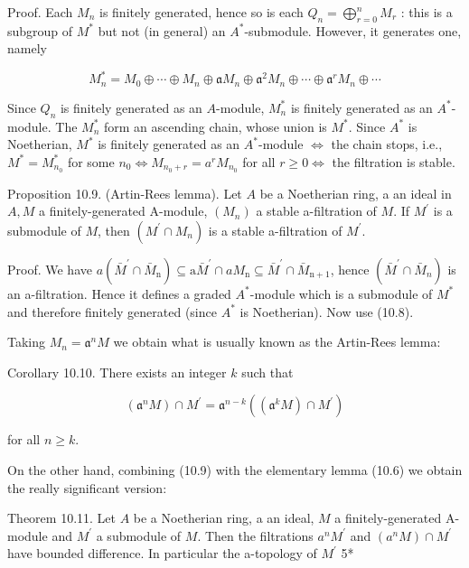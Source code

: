 \documentclass{standalone}
\theoremstyle{definition}
\theoremstyle{remark}
\begin{document}
Proof. Each $M_{n}$ is finitely generated, hence so is each $Q_{n}=\bigoplus_{r=0}^{n} M_{r}$ : this is a subgroup of $M^{*}$ but not (in general) an $A^{*}$-submodule. However, it generates one, namely

\[
M_{n}^{*}=M_{0} \oplus \cdots \oplus M_{n} \oplus \mathfrak{a} M_{n} \oplus \mathfrak{a}^{2} M_{n} \oplus \cdots \oplus \mathfrak{a}^{r} M_{n} \oplus \cdots
\]

Since $Q_{n}$ is finitely generated as an $A$-module, $M_{n}^{*}$ is finitely generated as an $A^{*}$-module. The $M_{n}^{*}$ form an ascending chain, whose union is $M^{*}$. Since $A^{*}$ is Noetherian, $M^{*}$ is finitely generated as an $A^{*}$-module $\Leftrightarrow$ the chain stops, i.e., $M^{*}=M_{n_{0}}^{*}$ for some $n_{0} \Leftrightarrow M_{n_{0}+r}=a^{r} M_{n_{0}}$ for all $r \geqslant 0 \Leftrightarrow$ the filtration is stable.

Proposition 10.9. (Artin-Rees lemma). Let $A$ be a Noetherian ring, a an ideal in $A, M$ a finitely-generated A-module, $\left(M_{n}\right)$ a stable a-filtration of $M$. If $M^{\prime}$ is a submodule of $M$, then $\left(M^{\prime} \cap M_{n}\right)$ is a stable a-filtration of $M^{\prime}$.

Proof. We have $a\left(\bar{M}^{\prime} \cap \bar{M}_{\mathrm{n}}\right) \subseteq \mathrm{a} \bar{M}^{\prime} \cap a M_{\mathrm{n}} \subseteq \bar{M}^{\prime} \cap \bar{M}_{\mathrm{n}+1}$, hence $\left(\bar{M}^{\prime} \cap \bar{M}_{n}\right)$ is an a-filtration. Hence it defines a graded $A^{*}$-module which is a submodule of $M^{*}$ and therefore finitely generated (since $A^{*}$ is Noetherian). Now use (10.8).

Taking $M_{n}=\mathfrak{a}^{n} M$ we obtain what is usually known as the Artin-Rees lemma:

Corollary 10.10. There exists an integer $k$ such that

\[
\left(\mathfrak{a}^{n} M\right) \cap M^{\prime}=\mathfrak{a}^{n-k}\left(\left(\mathfrak{a}^{k} M\right) \cap M^{\prime}\right)
\]

for all $n \geqslant k$.

On the other hand, combining (10.9) with the elementary lemma (10.6) we obtain the really significant version:

Theorem 10.11. Let $A$ be a Noetherian ring, a an ideal, $M$ a finitely-generated A-module and $M^{\prime}$ a submodule of $M$. Then the filtrations $a^{n} M^{\prime}$ and $\left(a^{n} M\right) \cap M^{\prime}$ have bounded difference. In particular the a-topology of $M^{\prime}$ 5*
\end{document}
